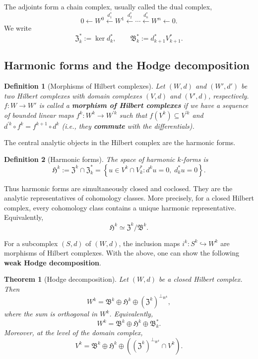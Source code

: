 \documentclass{article}
\newtheorem{theorem}{Theorem}[section]
\newtheorem{definition}{Definition}[section]
\newcommand{\f}[1]{\mathfrak{#1}}
\newcommand{\keyterm}[2][]{\textbf{#2}}
\begin{document}
The adjoints form a chain complex, usually called the dual complex,
\[
	0
	\longleftarrow
	W^0
	\xleftarrow{d_1^*}
	W^1
	\xleftarrow{d_2^*}
	\cdots
	\xleftarrow{d_n^*}
	W^n
	\longleftarrow
	0.
\]
We write
\[	\f Z_k^*
	:=
	\ker d_k^*,
	\qquad
	\f B_k^*
	:=
	d_{k+1}^* V_{k+1}^*.
\]

\subsection{Harmonic forms and the Hodge decomposition}

\begin{definition}[Morphisms of Hilbert complexes]
	Let $(W,d)$ and $(W',d')$ be two Hilbert complexes with domain complexes $(V,d)$ and $(V',d)$, respectively.
	$f : W\to W'$ is called a \keyterm{morphism of Hilbert complexes} if we have a sequence of bounded linear maps
	$f^{k} : W^{k} \to W^{\prime k}$ such that $f(V^{k})\subseteq V^{\prime k}$ and $d^{\prime k} \circ f^{k} = f^{k+1} \circ d^{k}$ (i.e., they \keyterm{commute} with the differentials).
\end{definition}


The central analytic objects in the Hilbert complex are the harmonic forms.

\begin{definition}[Harmonic forms]\label{def:harmonic-forms-expanded}
	The space of harmonic $k$-forms is
	\[	\f H^k
		:=
		\f Z^k \cap \f Z_k^*
		=
		\left\{
			u\in V^k\cap V_k^*
			:
			d^k u=0,\;
			d_k^*u=0
		\right\}.
	\]
\end{definition}

Thus harmonic forms are simultaneously closed and coclosed.  They are the
analytic representatives of cohomology classes.  More precisely, for a closed
Hilbert complex, every cohomology class contains a unique harmonic
representative.  Equivalently,
\[	\f H^k \simeq \f Z^k/\f B^k.
\]


For a subcomplex $(S,d)$ of $(W,d)$, the inclusion maps $i^{k}: S^{k} \hookrightarrow W^{k}$ are morphisms of Hilbert complexes.
With the above, one can show the following \keyterm[Hodge decomposition!in Hilbert complexes]{weak Hodge decomposition}.

\begin{theorem}
[Hodge decomposition]\label{thm:hodge-decomposition-expanded}
	Let $(W,d)$ be a closed Hilbert complex.  Then
\[
		W^k
		=
		\f B^k
		\oplus
		\f H^k
		\oplus
		(\f Z^k)^{\perp_{W^k}},
\]
where the sum is orthogonal in $W^k$.  Equivalently,
	\[
    W^k
		=
		\f B^k
		\oplus
		\f H^k
		\oplus
		\f B_k^*.
	\]
    Moreover, at the level of the domain complex,
\[		V^k
		=
		\f B^k
		\oplus
		\f H^k
		\oplus
		\left((\f Z^k)^{\perp_{W^k}}\cap V^k\right).
	\]
\end{theorem}
\end{document}
